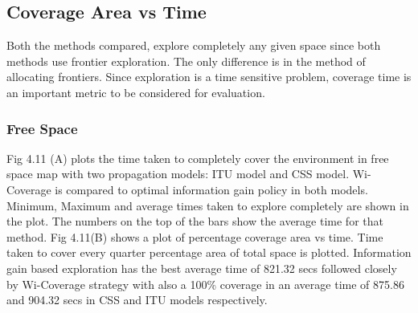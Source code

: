 \subsection{Coverage Area vs Time}
Both the methods compared, explore completely any given space since both methods use frontier exploration. The only difference is in the method of allocating frontiers. Since exploration is a time sensitive problem, coverage time is an important metric to be considered for evaluation. 

\subsubsection{Free Space}

Fig 4.11 (A) plots the time taken to completely cover the environment in free space map with two propagation models: ITU model and CSS model. Wi-Coverage is compared to optimal information gain policy in both models. Minimum, Maximum and average times taken to explore completely are shown in the plot. The numbers on the top of the bars show the average time for that method. Fig 4.11(B) shows a plot of percentage coverage area vs time. Time taken to cover every quarter percentage area of total space is plotted. Information gain based exploration has the best average time of 821.32 secs followed closely by Wi-Coverage strategy with also a 100\% coverage in an average time of 875.86 and 904.32 secs in CSS and ITU models respectively. 

